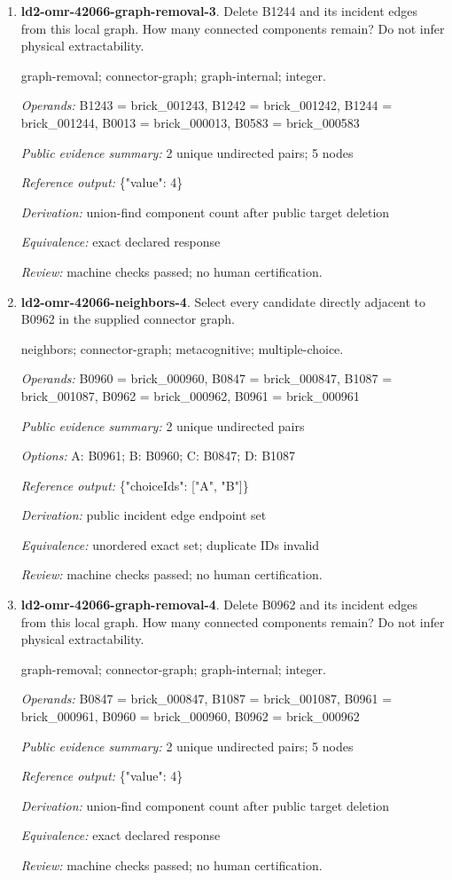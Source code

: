 \begin{enumerate}
\item \textbf{ld2-omr-42066-graph-removal-3}. Delete B1244 and its incident edges from this local graph. How many connected components remain? Do not infer physical extractability.
\par{\small graph-removal; connector-graph; graph-internal; integer.\par\textit{Operands:} B1243 = brick\_001243, B1242 = brick\_001242, B1244 = brick\_001244, B0013 = brick\_000013, B0583 = brick\_000583\par\textit{Public evidence summary:} 2 unique undirected pairs; 5 nodes\par\textit{Reference output:} \{"value": 4\}\par\textit{Derivation:} union-find component count after public target deletion\par\textit{Equivalence:} exact declared response\par\textit{Review:} machine checks passed; no human certification.}
\item \textbf{ld2-omr-42066-neighbors-4}. Select every candidate directly adjacent to B0962 in the supplied connector graph.
\par{\small neighbors; connector-graph; metacognitive; multiple-choice.\par\textit{Operands:} B0960 = brick\_000960, B0847 = brick\_000847, B1087 = brick\_001087, B0962 = brick\_000962, B0961 = brick\_000961\par\textit{Public evidence summary:} 2 unique undirected pairs\par\textit{Options:} A: B0961; B: B0960; C: B0847; D: B1087\par\textit{Reference output:} \{"choiceIds": ["A", "B"]\}\par\textit{Derivation:} public incident edge endpoint set\par\textit{Equivalence:} unordered exact set; duplicate IDs invalid\par\textit{Review:} machine checks passed; no human certification.}
\item \textbf{ld2-omr-42066-graph-removal-4}. Delete B0962 and its incident edges from this local graph. How many connected components remain? Do not infer physical extractability.
\par{\small graph-removal; connector-graph; graph-internal; integer.\par\textit{Operands:} B0847 = brick\_000847, B1087 = brick\_001087, B0961 = brick\_000961, B0960 = brick\_000960, B0962 = brick\_000962\par\textit{Public evidence summary:} 2 unique undirected pairs; 5 nodes\par\textit{Reference output:} \{"value": 4\}\par\textit{Derivation:} union-find component count after public target deletion\par\textit{Equivalence:} exact declared response\par\textit{Review:} machine checks passed; no human certification.}

\end{enumerate}
